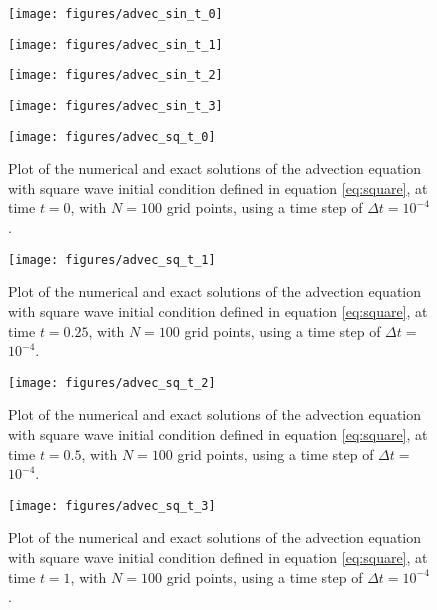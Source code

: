 
\begin{figure}[ht!]
	\centering
    \texttt{[image: figures/advec\_sin\_t\_0]}
    \caption{}
    \label{fig:advec_sin_t_0}
\end{figure}

\begin{figure}[ht!]
	\centering
    \texttt{[image: figures/advec\_sin\_t\_1]}
    \caption{}
    \label{fig:advec_sin_t_1}
\end{figure}

\begin{figure}[ht!]
	\centering
    \texttt{[image: figures/advec\_sin\_t\_2]}
    \caption{}
    \label{fig:advec_sin_t_2}
\end{figure}

\begin{figure}[ht!]
	\centering
    \texttt{[image: figures/advec\_sin\_t\_3]}
    \caption{}
    \label{fig:advec_sin_t_3}
\end{figure}


\newcommand{\labelplottwo}[3]{Plot of the numerical and exact solutions of the advection equation with square wave initial condition defined in equation \eqref{eq:square}, at time $t=#1$, with $N=#2$ grid points, using a time step of $\Delta t =$#3.}

\begin{figure}[ht!]
	\centering
    \texttt{[image: figures/advec\_sq\_t\_0]}
    \caption{\labelplottwo{0}{100}{$10^{-4}$}}
    \label{fig:advec_sq_t_0}
\end{figure}

\begin{figure}[ht!]
	\centering
    \texttt{[image: figures/advec\_sq\_t\_1]}
    \caption{\labelplottwo{0.25}{100}{$10^{-4}$}}
    \label{fig:advec_sq_t_1}
\end{figure}

\begin{figure}[ht!]
	\centering
    \texttt{[image: figures/advec\_sq\_t\_2]}
    \caption{\labelplottwo{0.5}{100}{$10^{-4}$}}
    \label{fig:advec_sq_t_2}
\end{figure}

\begin{figure}[ht!]
	\centering
    \texttt{[image: figures/advec\_sq\_t\_3]}
    \caption{\labelplottwo{1}{100}{$10^{-4}$}}
    \label{fig:advec_sq_t_3}
\end{figure}

